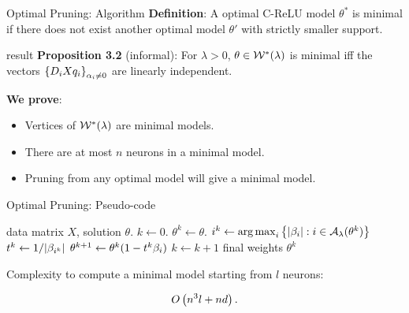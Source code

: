 \documentclass[usenames,dvipsnames,mathserif,notheorems]{beamer}
\newcommand{\bad}[1]{\textcolor{bad}{#1}}
\newcommand{\good}[1]{\textcolor{good}{#1}}
\begin{document}
\begin{frame}{Optimal Pruning: Algorithm}
	\textbf{Definition}: A optimal C-ReLU model \( \theta^* \) is minimal
	if there does
	not exist another optimal model \( \theta' \) with \bad{strictly smaller support}.

	\vspace{3ex}
	\pause

	\begin{beamercolorbox}[wd=\textwidth,sep=1em]{result}
		\textbf{Proposition 3.2} (informal):
		For \( \lambda > 0 \), \( \theta \in \mathcal{W}^*(\lambda) \) is \good{minimal}
		iff
		the vectors \( \left\{D_i X q_i\right\}_{\alpha_i \neq 0} \)
		are linearly independent.
	\end{beamercolorbox}

	\vspace{3ex}
	\pause

	\textbf{We prove}:
	\begin{itemize}
		\item Vertices of \( \mathcal{W}^*(\lambda) \) are minimal models.
		      \pause
		\item There are at most \( n \) neurons in a minimal model.
		      \pause
		\item Pruning from any optimal model will give a minimal model.
	\end{itemize}

\end{frame}

\begin{frame}{Optimal Pruning: Pseudo-code}
	\begin{algorithm}[H]
		\caption{Pruning solutions}
		\begin{algorithmic}
			 data matrix \( X \), solution \( \theta \).
			\STATE \( k \gets 0 \).
			\STATE \( \theta^k \gets \theta \).
			\WHILE {\( \exists \beta \neq 0 \) s.t. \( \good{\sum_{\bi \in \act(\theta^k)} \beta_\bi D_i X \theta_i^k = 0} \)}
			\STATE \( {i}^k \gets \mathop{\rm arg\,max}_{{i}} \left\{|\beta_{i}| : {i} \in {\mathcal{A}_{\lambda}}(\theta^k)\right\}  \)
			\STATE \( t^k \gets 1/|\beta_{{i}^k}| \)
			\STATE \( \theta^{k+1} \gets \theta^k (1 - t^k \beta_{i}) \)
			\STATE \( k \gets k + 1 \)
			\ENDWHILE
			 final weights \( \theta^k \)
		\end{algorithmic}
	\end{algorithm}

	\pause

	Complexity to compute a minimal model starting from \( l \) neurons:

	\[ O\left(n^3 l + nd\right). \]

\end{frame}
\end{document}
